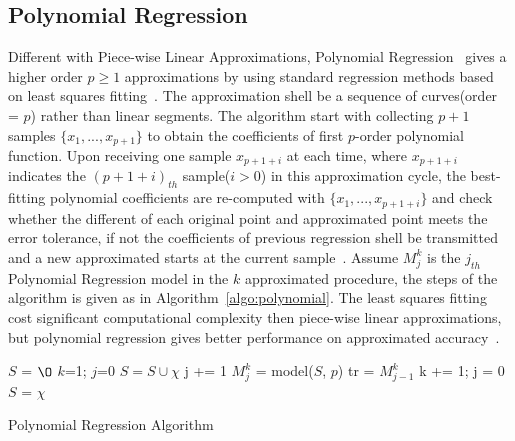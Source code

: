 \subsection{Polynomial Regression}
Different with Piece-wise Linear Approximations, Polynomial
Regression~\cite{zordan2014performance} gives a higher order $p \geqslant1$
approximations by using standard regression methods based on least squares
fitting~\cite{phillips2003interpolation}. The approximation shell be a sequence
of curves(order = $p$) rather than linear segments. The algorithm start with
collecting $p+1$ samples $\{x_1, ..., x_{p+1} \}$ to obtain the coefficients of
first $p$-order polynomial function. Upon receiving one sample $x_{p+1+i}$ at
each time, where $x_{p+1+i}$ indicates the $(p+1+i)_{th}$ sample($i>0$) in this
approximation cycle, the best-fitting polynomial coefficients are re-computed
with $\{ x_1, ..., x_{p+1+i}\}$ and check whether the different of each original
point and approximated point meets the error tolerance, if not the coefficients
of previous regression shell be transmitted and a new approximated starts at the
current sample~\cite{zordan2014performance}. Assume $M_j^k$ is the $j_{th}$
Polynomial Regression model in the $k$ approximated procedure, the steps of the
algorithm is given as in Algorithm~\ref{algo:polynomial}. The least squares
fitting cost significant computational complexity then piece-wise linear
approximations, but polynomial regression gives better performance on
approximated accuracy~\cite{zordan2014performance}.

\begin{algorithm}
\begin{algorithmic}[1]
\Input
\EndInput
\Output
\EndOutput

\State $S$ = $\O$
\State $k$=1; $j$=0
    \State $S = S \cup \chi$
        \State j += 1
        \State $M_j^k$ = model($S$, $p$)    
           
                \State tr = $M_{j-1}^k$ 
                \State k += 1; j = 0
                \State $S$ = $\chi$
            \EndIf
        \EndFor
    \EndIf
\EndWhile
\end{algorithmic}
\caption{Polynomial Regression Algorithm}
\label{algo:polynomial}
\end{algorithm}



